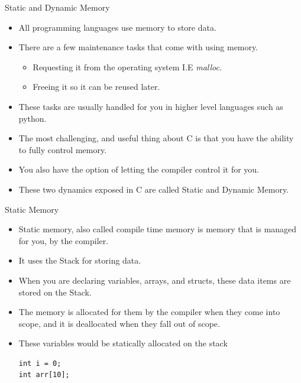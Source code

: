 \documentclass{beamer}
\begin{document}
\begin{frame}{Static and Dynamic Memory}
	\begin{itemize}[<+->]
		\item All programming languages use memory to store data.
		\item There are a few maintenance tasks that come with using memory.
		\begin{itemize}[<+->]
			\item Requesting it from the operating system I.E {\it malloc}.
			\item Freeing it so it can be reused later.
		\end{itemize}
		\item These tasks are usually handled for you in higher level languages such as python.
		\item The most challenging, and useful thing about C is that you have the ability to fully control memory.
		\item You also have the option of letting the compiler control it for you.
		\item These two dynamics exposed in C are called Static and Dynamic Memory.
	\end{itemize}
\end{frame}

\begin{frame}[fragile]{Static Memory}
	\begin{itemize}[<+->]
		\item Static memory, also called compile time memory is memory that is managed for you, by the compiler.
		\item It uses the Stack for storing data.
		\item When you are declaring variables, arrays, and structs, these data items are stored on the Stack.
		\item The memory is allocated for them by the compiler when they come into scope, and it is deallocated when they fall out of scope.
		\item These variables would be statically allocated on the stack
		\begin{verbatim}
int i = 0;
int arr[10];
\end{verbatim}
	\end{itemize}
\end{frame}
\end{document}
